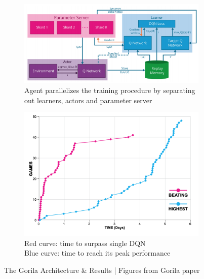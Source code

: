 \begin{figure}[!htb]
	\centering
	\begin{subfigure}[b]{0.4\textwidth}
		\centering
		\includegraphics[width=\textwidth]{figures/algos/gorila.png}
		\caption{Agent parallelizes the training procedure by separating out learners, actors and parameter server}
		\label{fig:gorila_arch}
	\end{subfigure}
	\hfill
	\begin{subfigure}[b]{0.4\textwidth}
		\centering
		\includegraphics[width=\textwidth]{figures/algos/gorila_results.png}
		\caption{Red curve: time to surpass single DQN\\
		Blue curve: time to reach its peak performance}
		\label{fig:gorila_results}
	\end{subfigure}
	\hfill
	\caption{The Gorila Architecture \& Results | Figures from Gorila paper~\parencite{nair2015massively}}
	\label{fig:gorila}
\end{figure}

